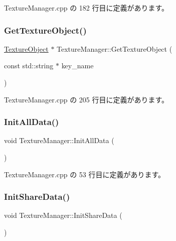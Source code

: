  Texture\+Manager.\+cpp の 182 行目に定義があります。

\mbox{\label{class_texture_manager_a18d1f3418511075804f9d11cff1010ff}} 
\subsubsection{\texorpdfstring{Get\+Texture\+Object()}{GetTextureObject()}}
{\footnotesize\ttfamily \mbox{\hyperlink{class_texture_object}{Texture\+Object}} $\ast$ Texture\+Manager\+::\+Get\+Texture\+Object (\begin{DoxyParamCaption}\item[{const std\+::string $\ast$}]{key\+\_\+name }\end{DoxyParamCaption})\hspace{0.3cm}{\ttfamily [static]}}



 Texture\+Manager.\+cpp の 205 行目に定義があります。

\mbox{\label{class_texture_manager_aee4c784f3f32bfe810bf66313735dece}} 
\subsubsection{\texorpdfstring{Init\+All\+Data()}{InitAllData()}}
{\footnotesize\ttfamily void Texture\+Manager\+::\+Init\+All\+Data (\begin{DoxyParamCaption}{ }\end{DoxyParamCaption})\hspace{0.3cm}{\ttfamily [static]}}



 Texture\+Manager.\+cpp の 53 行目に定義があります。

\mbox{\label{class_texture_manager_aed1e9666d0ef8698db754280a1d4bad4}} 
\subsubsection{\texorpdfstring{Init\+Share\+Data()}{InitShareData()}}
{\footnotesize\ttfamily void Texture\+Manager\+::\+Init\+Share\+Data (\begin{DoxyParamCaption}{ }\end{DoxyParamCaption})\hspace{0.3cm}{\ttfamily [static]}}



